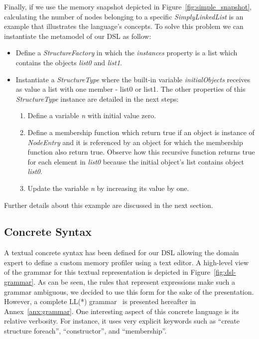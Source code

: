 Finally, if we use the memory snapshot depicted in Figure~\ref{fig:simple_snapshot}, calculating the number of nodes belonging to a specific \textit{SimplyLinkedList} is an example that illustrates the language's concepts.
To solve this problem we can instantiate the metamodel of our DSL as follow:
\begin{itemize}
\item Define a \textit{StructureFactory} in which the \textit{instances} property is a list which contains the objects \textit{list0} and \textit{list1}.
\item Instantiate a \textit{StructureType} where the built-in variable \textit{initialObjects} receives as value a list with one member - list0 or list1.
      The other properties of this \textit{StructureType} instance are detailed in the next steps: 
      \begin{enumerate}
      \item Define a variable \textit{n} with initial value zero.
      \item Define a membership function which return true if an object is instance of \textit{NodeEntry} and it is referenced by an object for which the membership function also return true. Observe how this recursive function returns true for each element in \textit{list0} because the initial object's list contains object \textit{list0}. 
      \item Update the variable \textit{n} by increasing its value by one.
      \end{enumerate}  
\end{itemize}
Further details about this example are discussed in the next section.

\subsection{Concrete Syntax}\label{sec:concrete-syntax}

A textual concrete syntax has been defined for our DSL allowing the domain expert to define a custom memory profiler using a text editor.
A high-level view of the grammar for this textual representation is depicted in Figure~\ref{fig:dsl-grammar}.
As can be seen, the rules that represent expressions make such a grammar ambiguous, we decided to use this form for the sake of the presentation.
However, a complete LL(*) grammar~\cite{Parr:2011:LFA:1993498.1993548} is presented hereafter in Annex~\ref{anx:grammar}.
One interesting aspect of this concrete language is its relative verbosity.
For instance, it uses very explicit keywords such as ``create structure foreach'', ``constructor'', and ``membership''.


